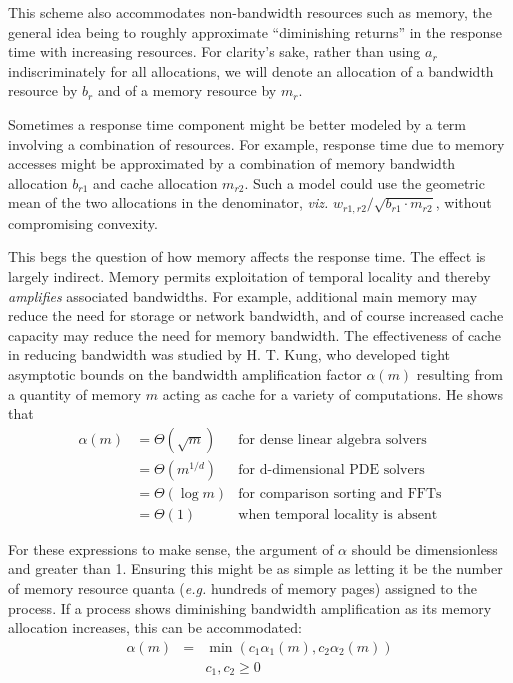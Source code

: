 This scheme also accommodates non-bandwidth resources such as memory,
the general idea being to roughly approximate ``diminishing returns'' in the response time with increasing resources.
For clarity's sake, rather than using $a_r$ indiscriminately for all allocations,
we will denote an allocation of a bandwidth resource by $b_r$ and of a memory resource by $m_r$.

Sometimes a response time component might be better modeled by a term involving a combination of resources.
For example, response time due to memory accesses might be approximated
by a combination of memory bandwidth allocation $b_{r1}$ and cache allocation $m_{r2}$.
Such a model could use the geometric mean of the two allocations in the denominator,
\emph{viz.} $w_{r1,r2}/\sqrt{b_{r1}\cdot m_{r2}}$, without compromising convexity.

This begs the question of how memory affects the response time.
The effect is largely indirect.
Memory permits exploitation of temporal locality and thereby \emph{amplifies} associated bandwidths.
For example, additional main memory may reduce the need for storage or network bandwidth,
and of course increased cache capacity may reduce the need for memory bandwidth.
The effectiveness of cache in reducing bandwidth was studied by
H. T. Kung\cite{Kung}, who developed tight asymptotic bounds on the bandwidth amplification
factor $\alpha(m)$ resulting from a quantity of memory $m$ acting as cache for a variety of computations.
He shows that
\begin{displaymath}
\begin{array}{lll}
\alpha(m) &= \Theta(\sqrt m) & \mbox{for dense linear algebra solvers} \\
          &= \Theta(m^{1/d}) & \mbox{for d-dimensional PDE solvers} \\
          &= \Theta(\log m)  & \mbox{for comparison sorting and FFTs} \\
          &= \Theta(1)       & \mbox{when temporal locality is absent}
\end{array}
\end{displaymath}

For these expressions to make sense, the argument of $\alpha$ should be dimensionless and greater than 1.
Ensuring this might be as simple as letting it be the number of memory resource quanta
(\emph{e.g.} hundreds of memory pages) assigned to the process.
If a process shows diminishing bandwidth amplification as its memory allocation increases, this can be accommodated:
\begin{eqnarray*}
\alpha(m) &=& \min(c_1\alpha_1(m),c_2\alpha_2(m)) \\
          & &c_1,c_2 \geq 0
\end{eqnarray*}

